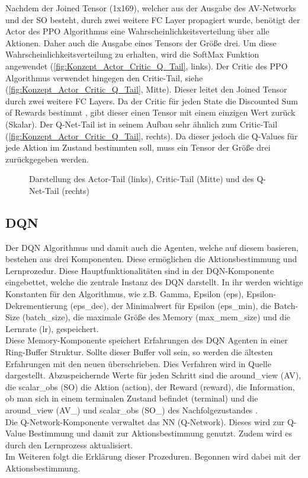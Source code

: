 Nachdem der Joined Tensor (1x169), welcher aus der Ausgabe des AV-Networks und der SO besteht, durch zwei weitere FC Layer propagiert wurde, benötigt der Actor des PPO Algorithmus eine Wahrscheinlichkeitsverteilung über alle Aktionen. Daher auch die Ausgabe eines Tensors der Größe drei. Um diese Wahrscheinlichkeitsverteilung zu erhalten, wird die SoftMax Funktion angewendet (\autoref{fig:Konzept_Actor_Critic_Q_Tail}, links).
Der Critic des PPO Algorithmus verwendet hingegen den Critic-Tail, siehe (\autoref{fig:Konzept_Actor_Critic_Q_Tail}, Mitte). Dieser leitet den Joined Tensor durch zwei weitere FC Layers. Da der Critic für jeden State die Discounted Sum of Rewards bestimmt , gibt dieser einen Tensor mit einem einzigen Wert zurück (Skalar).
Der Q-Net-Tail ist in seinem Aufbau sehr ähnlich zum Critic-Tail (\autoref{fig:Konzept_Actor_Critic_Q_Tail}, rechts). Da dieser jedoch die Q-Values für jede Aktion im Zustand bestimmten soll, muss ein Tensor der Größe drei zurückgegeben werden.
\begin{figure}[H]
	\centering
	
	\caption[Actor-, Critic- und Q-Net-Tail]{Darstellung des Actor-Tail (links), Critic-Tail (Mitte) und des Q-Net-Tail (rechts)}
	\label{fig:Konzept_Actor_Critic_Q_Tail}
\end{figure}

\subsection{DQN} \label{subsec:Konzept_DQN}
Der DQN Algorithmus und damit auch die Agenten, welche auf diesem basieren, bestehen aus drei Komponenten. Diese ermöglichen die Aktionsbestimmung und Lernprozedur.
Diese Hauptfunktionalitäten sind in der DQN-Komponente eingebettet, welche die zentrale Instanz des DQN darstellt. In ihr werden wichtige Konstanten für den Algorithmus, wie z.B. Gamma, Epsilon (eps), Epsilon-Dekrementierung (eps\_dec), der Minimalwert für Epsilon (eps\_min), die Batch-Size (batch\_size), die maximale Größe des Memory (max\_mem\_size) und die Lernrate (lr), gespeichert.\\
Diese Memory-Komponente speichert Erfahrungen des DQN Agenten in einer Ring-Buffer Struktur. Sollte dieser Buffer voll sein, so werden die ältesten Erfahrungen mit den neuen überschrieben. Dies Verfahren wird in Quelle \cite[S. 5]{DBLP:journals/corr/MnihKSGAWR13} dargestellt.
Abzuspeichernde Werte für jeden Schritt sind die around\_view (AV), die scalar\_obs (SO) die Aktion (action), der Reward (reward), die Information, ob man sich in einem terminalen Zustand befindet (terminal) und die around\_view (AV\_) und scalar\_obs (SO\_) des Nachfolgezustandes .\\
Die Q-Network-Komponente verwaltet das NN (Q-Network). Dieses wird zur Q-Value Bestimmung und damit zur Aktionsbestimmung genutzt. Zudem wird es durch den Lernprozess aktualisiert.\\
Im Weiteren folgt die Erklärung dieser Prozeduren. Begonnen wird dabei mit der Aktionsbestimmung.

